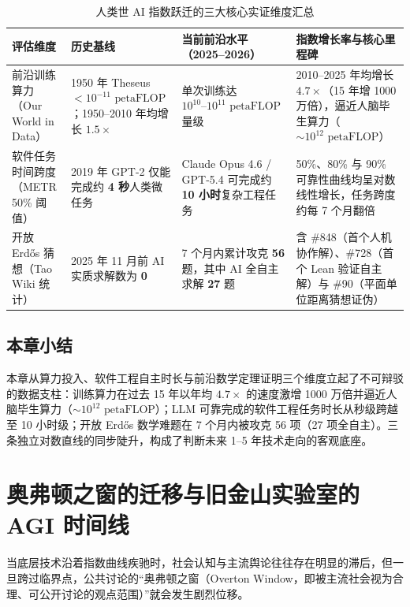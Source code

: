 \documentclass[a4paper]{article}
\begin{document}
\begin{table}[H]
\centering
\small
\caption{人类世 AI 指数跃迁的三大核心实证维度汇总}
\begin{tabular}{p{2.6cm}p{3.2cm}p{3.6cm}p{4.2cm}}
\toprule
\textbf{评估维度} & \textbf{历史基线} & \textbf{当前前沿水平（2025--2026）} & \textbf{指数增长率与核心里程碑} \\
\midrule
前沿训练算力\newline（Our World in Data） & 1950 年 Theseus $<10^{-11}\text{ petaFLOP}$；1950--2010 年均增长 $1.5\times$ & 单次训练达 $10^{10}\text{--}10^{11}\text{ petaFLOP}$ 量级 & 2010--2025 年均增长 \textbf{$4.7\times$}（15 年增 1000 万倍），逼近人脑毕生算力（$\sim 10^{12}\text{ petaFLOP}$） \\
软件任务时间跨度\newline（METR 50\% 阈值） & 2019 年 GPT-2 仅能完成约 \textbf{4 秒}人类微任务 & Claude Opus 4.6 / GPT-5.4 可完成约 \textbf{10 小时}复杂工程任务 & 50\%、80\% 与 90\% 可靠性曲线均呈对数线性增长，任务跨度约每 7 个月翻倍 \\
开放 Erdős 猜想\newline（Tao Wiki 统计） & 2025 年 11 月前 AI 实质求解数为 \textbf{0} & 7 个月内累计攻克 \textbf{56} 题，其中 AI 全自主求解 \textbf{27} 题 & 含 \#848（首个人机协作解）、\#728（首个 Lean 验证自主解）与 \#90（平面单位距离猜想证伪） \\
\bottomrule
\end{tabular}
\end{table}

\subsection{本章小结}
本章从算力投入、软件工程自主时长与前沿数学定理证明三个维度立起了不可辩驳的数据支柱：训练算力在过去 15 年以年均 $4.7\times$ 的速度激增 1000 万倍并逼近人脑毕生算力（$\sim 10^{12}\text{ petaFLOP}$）；LLM 可靠完成的软件工程任务时长从秒级跨越至 10 小时级；开放 Erdős 数学难题在 7 个月内被攻克 56 项（27 项全自主）。三条独立对数直线的同步陡升，构成了判断未来 1--5 年技术走向的客观底座。

\clearpage
\section{奥弗顿之窗的迁移与旧金山实验室的 AGI 时间线}

当底层技术沿着指数曲线疾驰时，社会认知与主流舆论往往存在明显的滞后，但一旦跨过临界点，公共讨论的“奥弗顿之窗（Overton Window，即被主流社会视为合理、可公开讨论的观点范围）”就会发生剧烈位移。
\end{document}
